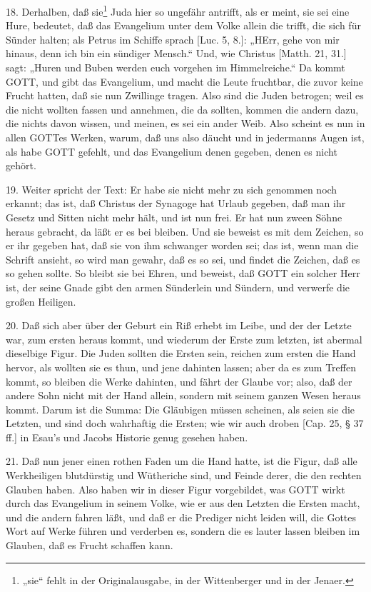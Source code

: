 18. Derhalben, daß sie\footnote{„sie“ fehlt in der Originalausgabe, in der Wittenberger und in der Jenaer.} Juda hier so ungefähr antrifft, als er meint, sie sei eine Hure, bedeutet, daß das Evangelium unter dem Volke allein die trifft, die sich für Sünder halten; als Petrus im Schiffe sprach [Luc. 5, 8.]: „HErr, gehe von mir hinaus, denn ich bin ein sündiger
Mensch.“ Und, wie Christus [Matth. 21, 31.] sagt: „Huren und Buben werden euch vorgehen im Himmelreiche.“ Da kommt GOTT, und gibt das Evangelium, und macht die Leute fruchtbar, die zuvor keine Frucht hatten, daß sie nun Zwillinge tragen. Also sind die Juden betrogen; weil es die nicht wollten fassen und annehmen, die da sollten, kommen die andern dazu, die nichts davon wissen, und meinen, es sei ein ander Weib. Also scheint es nun in allen GOTTes Werken, warum, daß uns also däucht und in jedermanns Augen ist, als habe GOTT gefehlt, und das Evangelium denen gegeben, denen es nicht gehört.

19. Weiter spricht der Text: Er habe sie nicht mehr zu sich genommen noch erkannt; das ist, daß Christus der Synagoge hat Urlaub gegeben, daß man ihr Gesetz und Sitten nicht mehr hält, und ist nun frei. Er hat nun zween Söhne heraus gebracht, da läßt er es bei bleiben. Und sie beweist es mit dem Zeichen, so er ihr gegeben hat, daß sie von ihm schwanger worden sei; das ist, wenn man die Schrift ansieht, so wird man gewahr, daß es so sei, und findet die Zeichen, daß es so gehen sollte. So bleibt sie bei Ehren, und beweist, daß GOTT ein solcher Herr ist, der seine Gnade gibt den armen Sünderlein und Sündern, und verwerfe die großen Heiligen.

20. Daß sich aber über der Geburt ein Riß erhebt im Leibe, und der der Letzte war, zum ersten heraus kommt, und wiederum der Erste zum letzten, ist abermal dieselbige Figur. Die Juden sollten die Ersten sein, reichen zum ersten die Hand hervor, als wollten sie es thun, und jene dahinten lassen; aber da es zum Treffen kommt, so bleiben die Werke dahinten, und fährt der Glaube vor; also, daß der andere Sohn nicht mit der Hand allein, sondern mit seinem ganzen Wesen heraus kommt. Darum ist die Summa: Die Gläubigen müssen scheinen, als seien sie die Letzten, und sind doch wahrhaftig die Ersten; wie wir auch droben [Cap. 25, § 37 ff.] in Esau’s und Jacobs Historie genug gesehen haben.

21. Daß nun jener einen rothen Faden um die Hand hatte, ist die Figur, daß alle Werkheiligen blutdürstig und Wütheriche sind, und Feinde derer, die den rechten Glauben haben. Also haben wir in dieser Figur vorgebildet, was GOTT wirkt durch das Evangelium in seinem Volke, wie er aus den Letzten die Ersten macht, und die andern fahren läßt, und daß er die Prediger nicht leiden will, die Gottes Wort auf Werke führen und verderben es, sondern die es lauter lassen bleiben im Glauben, daß es Frucht schaffen kann.

